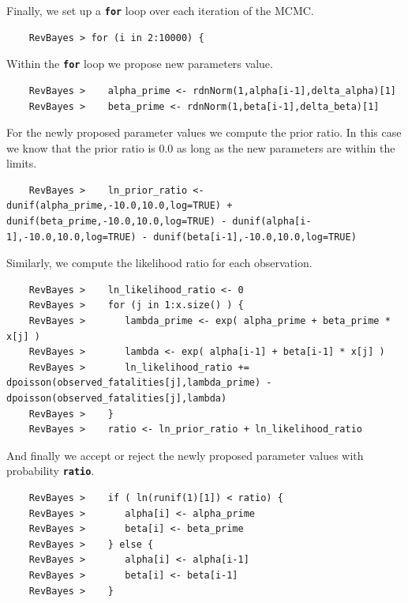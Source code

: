 \documentclass[11pt]{article}
\newcommand{\cl}[1]{{\texttt{\textbf{#1}}}}
\begin{document}
Finally, we set up a \cl{for} loop over each iteration of the MCMC.
{\tt \begin{snugshade*}
\begin{lstlisting}    
    RevBayes > for (i in 2:10000) {
\end{lstlisting}
\end{snugshade*}}
Within the \cl{for} loop we propose new parameters value.
{\tt \begin{snugshade*}
\begin{lstlisting}    
    RevBayes >    alpha_prime <- rdnNorm(1,alpha[i-1],delta_alpha)[1]
    RevBayes >    beta_prime <- rdnNorm(1,beta[i-1],delta_beta)[1]
\end{lstlisting}
\end{snugshade*}}
For the newly proposed parameter values we compute the prior ratio.
In this case we know that the prior ratio is 0.0 as long as the new parameters are within the limits.
{\tt \begin{snugshade*}
\begin{lstlisting}    
    RevBayes >    ln_prior_ratio <- dunif(alpha_prime,-10.0,10.0,log=TRUE) + dunif(beta_prime,-10.0,10.0,log=TRUE) - dunif(alpha[i-1],-10.0,10.0,log=TRUE) - dunif(beta[i-1],-10.0,10.0,log=TRUE)
\end{lstlisting}
\end{snugshade*}}
Similarly, we compute the likelihood ratio for each observation.
{\tt \begin{snugshade*}
\begin{lstlisting}    
    RevBayes >    ln_likelihood_ratio <- 0
    RevBayes >    for (j in 1:x.size() ) {
    RevBayes >       lambda_prime <- exp( alpha_prime + beta_prime * x[j] )
    RevBayes >       lambda <- exp( alpha[i-1] + beta[i-1] * x[j] )
    RevBayes >       ln_likelihood_ratio += dpoisson(observed_fatalities[j],lambda_prime) - dpoisson(observed_fatalities[j],lambda)
    RevBayes >    }
    RevBayes >    ratio <- ln_prior_ratio + ln_likelihood_ratio
\end{lstlisting}
\end{snugshade*}}
And finally we accept or reject the newly proposed parameter values with probability \cl{ratio}.
{\tt \begin{snugshade*}
\begin{lstlisting}    
    RevBayes >    if ( ln(runif(1)[1]) < ratio) {
    RevBayes >       alpha[i] <- alpha_prime
    RevBayes >       beta[i] <- beta_prime
    RevBayes >    } else {
    RevBayes >       alpha[i] <- alpha[i-1]
    RevBayes >       beta[i] <- beta[i-1]
    RevBayes >    }
\end{lstlisting}
\end{snugshade*}}
\end{document}
